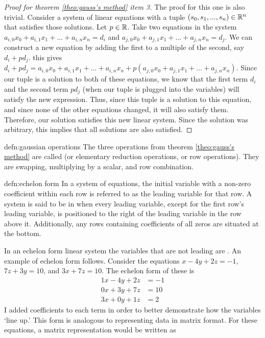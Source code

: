 \begin{proof}[Proof for theorem \ref{theo:gauss's method} item 3]
	The proof for this one is also trivial. Consider a system of linear equations with a tuple $(s_0, s_1,..., s_n) \in{\mathbb R}^n$ that satisfies those solutions. Let $p \in {\mathbb R}$. Take two equations in the system $a_{i,0}x_0 + a_{i,1}x_1 + ... + a_{i,n}x_n = d_i$ and $a_{j,0}x_0 + a_{j,1}x_1 + ... + a_{j,n}x_n = d_j$. We can construct a new equation by adding the first to a multiple of the second, say $d_i + pd_j$. this gives $d_i + pd_j = a_{i,0}x_0 + a_{i,1}x_1 + ... + a_{i,n}x_n + p(a_{j,0}x_0 + a_{j,1}x_1 + ... + a_{j,n}x_n)$. Since our tuple is a solution to both of these equations, we know that the first term $d_i$ and the second term $pd_j$ (when our tuple is plugged into the variables) will satisfy the new expression. Thus, since this tuple is a solution to this equation, and since none of the other equations changed, it will also satisfy them. Therefore, our solution satisfies this new linear system. Since the solution was arbitrary, this implies that all solutions are also satisfied.
\end{proof}

\begin{defn}{defn:gaussian operations}
	The three operations from theorem \ref{theo:gauss's method} are called  (or elementary reduction operations, or row operations). They are swapping, multiplying by a scalar, and row combination.
\end{defn}


\begin{defn}{defn:echelon form}
	In a system of equations, the initial variable with a non-zero coefficient within each row is referred to as the leading variable for that row. A system is said to be in  when every leading variable, except for the first row's leading variable, is positioned to the right of the leading variable in the row above it. Additionally, any rows containing coefficients of all zeros are situated at the bottom. 
\end{defn}


In an echelon form linear system the variables that are not leading are . An example of echelon form follows. Consider the equations $x - 4y + 2z = -1$, $7z + 3y = 10$, and $3x + 7z = 10$. The echelon form of these is 
\begin{align}
1x - 4y + 2z &= -1 \\
0x+3y + 7z &= 10 \\
3x+0y+1z &= 2
\end{align}
I added coefficients to each term in order to better demonstrate how the variables `line up.' This form is analogous to representing data in matrix format. For these equations, a matrix representation would be written as

